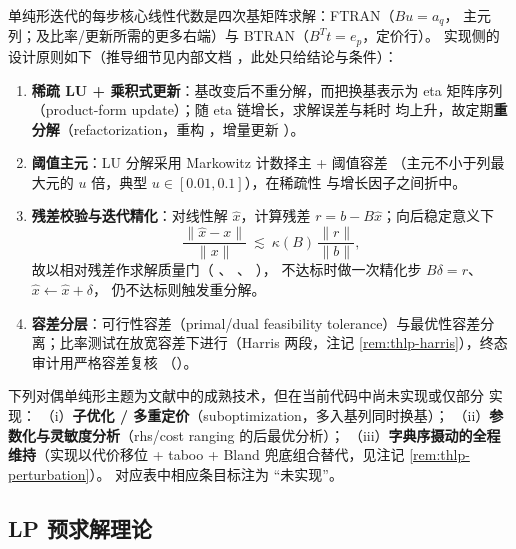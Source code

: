 单纯形迭代的每步核心线性代数是四次基矩阵求解：FTRAN（$Bu=a_q$，
主元列；及比率/更新所需的更多右端）与 BTRAN（$B^{T}t=e_p$，定价行）。
实现侧的设计原则如下（推导细节见内部文档
，此处只给结论与条件）：

\begin{enumerate}
  \item \textbf{稀疏 LU + 乘积式更新}：基改变后不重分解，而把换基表示为
        eta 矩阵序列（product-form update）；随 eta 链增长，求解误差与耗时
        均上升，故定期\textbf{重分解}（refactorization，重构
        ，增量更新
        ）。
  \item \textbf{阈值主元}：LU 分解采用 Markowitz 计数择主 + 阈值容差
        （主元不小于列最大元的 $u$ 倍，典型 $u\in[0.01,0.1]$），在稀疏性
        与增长因子之间折中。
  \item \textbf{残差校验与迭代精化}：对线性解 $\hat x$，计算残差
        $r=b-B\hat x$；向后稳定意义下
        \begin{equation}\label{eq:thlp-refinement}
          \frac{\|\hat x-x\|}{\|x\|}
          \ \lesssim\ \kappa(B)\,\frac{\|r\|}{\|b\|},
        \end{equation}
        故以相对残差作求解质量门（
        、
        、
        ），
        不达标时做一次精化步 $B\delta=r$、$\hat x\leftarrow\hat x+\delta$，
        仍不达标则触发重分解。
  \item \textbf{容差分层}：可行性容差（primal/dual feasibility
        tolerance）与最优性容差分离；比率测试在放宽容差下进行（Harris
        两段，注记 \ref{rem:thlp-harris}），终态审计用严格容差复核
        （）。
\end{enumerate}

\begin{gapnote}
下列对偶单纯形主题为文献中的成熟技术，但在当前代码中尚未实现或仅部分
实现：
（i）\textbf{子优化 / 多重定价}（suboptimization，多入基列同时换基）；
（ii）\textbf{参数化与灵敏度分析}（rhs/cost ranging 的后最优分析）；
（iii）\textbf{字典序摄动的全程维持}（实现以代价移位 + taboo + Bland
兜底组合替代，见注记 \ref{rem:thlp-perturbation}）。
对应表中相应条目标注为 ``未实现''。
\end{gapnote}

\subsection{LP 预求解理论}\label{subsec:thlp-presolve}

